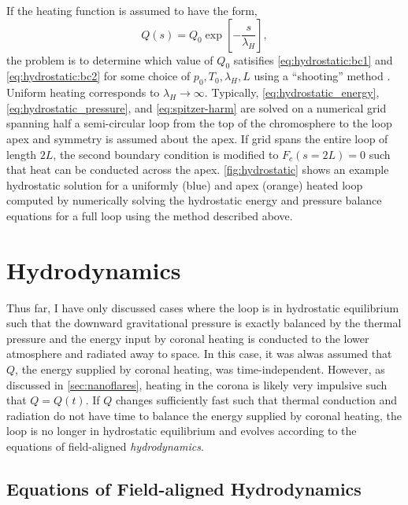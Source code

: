 If the heating function is assumed to have the form,
\begin{equation*}
    Q(s) = Q_0\exp{\left[-\frac{s}{\lambda_H}\right]},
\end{equation*}
the problem is to determine which value of $Q_0$ satisifies \autoref{eq:hydrostatic:bc1} and \autoref{eq:hydrostatic:bc2} for some choice of $p_0,T_0,\lambda_H,L$ using a ``shooting'' method \citep[see Section 17.1 of][]{press_numerical_1992}. Uniform heating corresponds to $\lambda_H\to\infty$. Typically, \autoref{eq:hydrostatic_energy}, \autoref{eq:hydrostatic_pressure}, and \autoref{eq:spitzer-harm} are solved on a numerical grid spanning half a semi-circular loop from the top of the chromosphere to the loop apex and symmetry is assumed about the apex. If grid spans the entire loop of length $2L$, the second boundary condition is modified to $F_c(s=2L)=0$ such that heat can be conducted across the apex. \autoref{fig:hydrostatic} shows an example hydrostatic solution for a uniformly (blue) and apex (orange) heated loop computed by numerically solving the hydrostatic energy and pressure balance equations for a full loop using the method described above.

\section{Hydrodynamics}\label{sec:hydrodynamics}

Thus far, I have only discussed cases where the loop is in hydrostatic equilibrium such that the downward gravitational pressure is exactly balanced by the thermal pressure and the energy input by coronal heating is conducted to the lower atmosphere and radiated away to space. In this case, it was alwas assumed that $Q$, the energy supplied by coronal heating, was time-independent. However, as discussed in \autoref{sec:nanoflares}, heating in the corona is likely  very impulsive such that $Q=Q(t)$. If $Q$ changes sufficiently fast such that thermal conduction and radiation do not have time to balance the energy supplied by coronal heating, the loop is no longer in hydrostatic equilibrium and evolves according to the equations of field-aligned \textit{hydrodynamics}.

\subsection{Equations of Field-aligned Hydrodynamics}\label{sec:hydrodynamic-equations}

